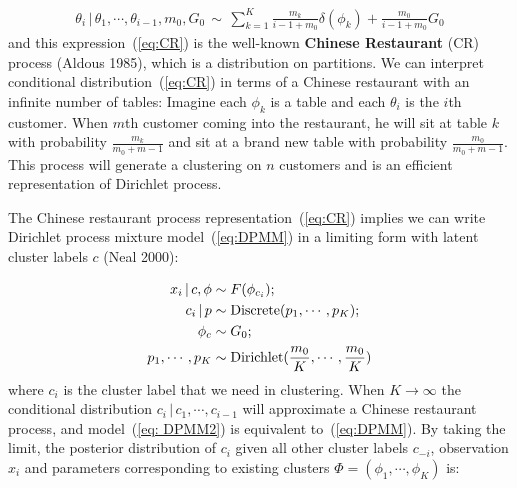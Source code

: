 \documentclass[12pt]{article}
\begin{document}
\begin{eqnarray}
\label{eq:CR}
    \theta_i\,|\, \theta_1,\cdots,\theta_{i-1},m_0,G_0 \, \sim\, \sum_{k=1}^{K}\frac{m_k}{i-1+m_0}\delta(\phi_k) + \frac{m_0}{i-1+m_0}G_0
\end{eqnarray}
and this expression~(\ref{eq:CR}) is the well-known \textbf{Chinese Restaurant} (CR) process (Aldous 1985), which is a distribution on partitions. We can interpret conditional distribution~(\ref{eq:CR}) in terms of a Chinese restaurant with an infinite number of tables: Imagine each $\phi_k$ is a table and each $\theta_i$ is the $i$th customer. When $m$th customer coming into the restaurant, he will sit at table $k$ with probability $\frac{m_k}{m_0+m-1}$ and sit at a brand new table with probability $\frac{m_0}{m_0+m-1}$. This process will generate a clustering on $n$ customers and is an efficient representation of Dirichlet process. 

The Chinese restaurant process representation~(\ref{eq:CR}) implies we can write Dirichlet process mixture model~(\ref{eq:DPMM}) in a limiting form with latent cluster labels $c$ (Neal 2000):

\begin{align}
\label{eq: DPMM2}
\begin{split}
    x_i\,|\,c,\phi &\sim F(\phi_{c_i});\\
    c_i\,|\,p &\sim {\rm Discrete}(p_1,\cdots,p_K);\\
    \phi_c &\sim G_0;\\
    p_1,\cdots,p_K &\sim {\rm Dirichlet}(\frac{m_0}{K},\cdots,\frac{m_0}{K})
\end{split}
\end{align}
where $c_i$ is the cluster label that we need in clustering. When $K\to \infty$ the conditional distribution $c_i\,|\,c_1,\cdots,c_{i-1}$ will approximate a Chinese restaurant process, and model~(\ref{eq: DPMM2}) is equivalent to~(\ref{eq:DPMM}). By taking the limit, the posterior distribution of $c_i$ given all other cluster labels $c_{-i}$, observation $x_i$ and parameters corresponding to existing clusters $\Phi = (\phi_1,\cdots,\phi_K)$ is:
\end{document}

